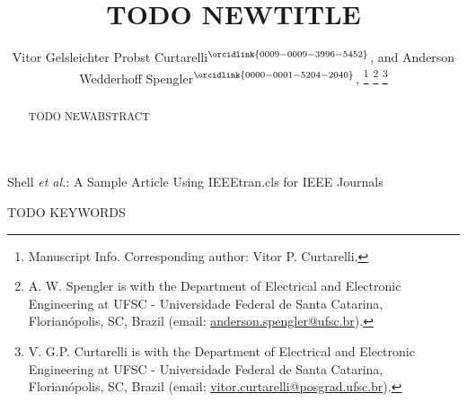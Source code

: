 \title{TODO NEWTITLE}

\author{%
	Vitor Gelsleichter Probst Curtarelli$^{\orcidlink{0009-0009-3996-5452}}$, and Anderson Wedderhoff Spengler$^{\orcidlink{0000-0001-5204-2040}}$, 
	\thanks{\ieee Manuscript Info. Corresponding author: Vitor P. Curtarelli.}%
	\thanks{A. W. Spengler is with the Department of Electrical and Electronic Engineering at UFSC - Universidade Federal de Santa Catarina, Florianópolis, SC, Brazil (email: \url{anderson.spengler@ufsc.br}).}%
	\thanks{V. G.P. Curtarelli is with the Department of Electrical and Electronic Engineering at UFSC - Universidade Federal de Santa Catarina, Florianópolis, SC, Brazil (email: \url{vitor.curtarelli@posgrad.ufsc.br}).}%
}

%
{Shell \MakeLowercase{\textit{et al.}}: A Sample Article Using IEEEtran.cls for IEEE Journals}


\maketitle

\begin{abstract}	
	TODO NEWABSTRACT
\end{abstract}

\begin{IEEEkeywords}
	TODO KEYWORDS
\end{IEEEkeywords}